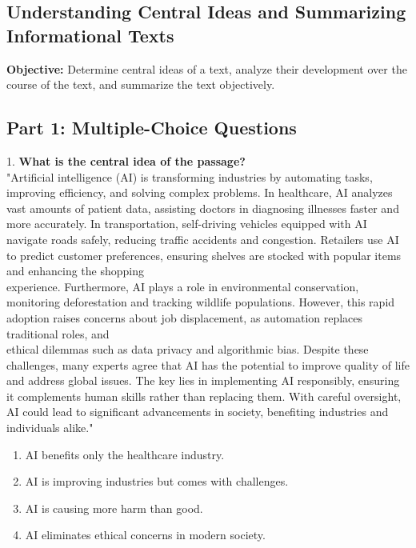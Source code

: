 \documentclass[12pt]{article}
\begin{document}
\subsection*{Understanding Central Ideas and Summarizing Informational Texts}
\onehalfspacing

\begin{tcolorbox}[colframe=black!40, colback=gray!0, title=Learning Objective]
\textbf{Objective:} Determine central ideas of a text, analyze their development over the course of the text, and summarize the text objectively.
\end{tcolorbox}

\subsection*{Part 1: Multiple-Choice Questions}

1. \textbf{What is the central idea of the passage?\\}
"Artificial intelligence (AI) is transforming industries by automating tasks, improving efficiency, and solving complex problems. In healthcare, AI analyzes vast amounts of patient data, assisting doctors in diagnosing illnesses faster and more accurately. In transportation, self-driving vehicles equipped with AI navigate roads safely, reducing traffic accidents and congestion. Retailers use AI to predict customer preferences, ensuring shelves are stocked with popular items and enhancing the shopping \\experience. Furthermore, AI plays a role in environmental conservation, monitoring deforestation and tracking wildlife populations. However, this rapid adoption raises concerns about job displacement, as automation replaces traditional roles, and \\ethical dilemmas such as data privacy and algorithmic bias. Despite these challenges, many experts agree that AI has the potential to improve quality of life and address global issues. The key lies in implementing AI responsibly, ensuring it complements human skills rather than replacing them. With careful oversight, AI could lead to significant advancements in society, benefiting industries and individuals alike."  
\begin{enumerate}[label=\Alph*.]
    \item AI benefits only the healthcare industry.  
    \item AI is improving industries but comes with challenges.  
    \item AI is causing more harm than good.  
    \item AI eliminates ethical concerns in modern society.  
\end{enumerate}
\end{document}
